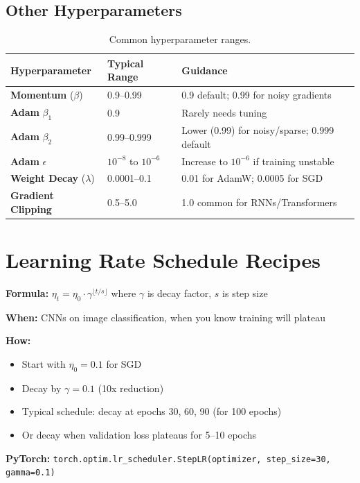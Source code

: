 \documentclass[../main.tex]{subfiles}
\begin{document}
\subsection{Other Hyperparameters}

\begin{table}[htbp]
\centering
\renewcommand{\arraystretch}{1.2}
\begin{tabular}{llp{6cm}}
\toprule
\textbf{Hyperparameter} & \textbf{Typical Range} & \textbf{Guidance} \\
\midrule
\textbf{Momentum} ($\beta$) & 0.9--0.99 & 0.9 default; 0.99 for noisy gradients \\
\textbf{Adam} $\beta_1$ & 0.9 & Rarely needs tuning \\
\textbf{Adam} $\beta_2$ & 0.99--0.999 & Lower (0.99) for noisy/sparse; 0.999 default \\
\textbf{Adam} $\epsilon$ & $10^{-8}$ to $10^{-6}$ & Increase to $10^{-6}$ if training unstable \\
\textbf{Weight Decay} ($\lambda$) & 0.0001--0.1 & 0.01 for AdamW; 0.0005 for SGD \\
\textbf{Gradient Clipping} & 0.5--5.0 & 1.0 common for RNNs/Transformers \\
\bottomrule
\end{tabular}
\caption{Common hyperparameter ranges.}
\label{tab:hyperparam-ranges}
\end{table}

\section{Learning Rate Schedule Recipes}\label{sec:cheat-schedules}

\begin{tcolorbox}[colback=blue!3, colframe=blue!40, title={\textbf{Step Decay}}, fonttitle=\bfseries]
\textbf{Formula:} $\eta_t = \eta_0 \cdot \gamma^{\lfloor t / s \rfloor}$ where $\gamma$ is decay factor, $s$ is step size

\textbf{When:} CNNs on image classification, when you know training will plateau

\textbf{How:}
\begin{itemize}[leftmargin=*, itemsep=1pt]
    \item Start with $\eta_0 = 0.1$ for SGD
    \item Decay by $\gamma = 0.1$ (10x reduction)
    \item Typical schedule: decay at epochs 30, 60, 90 (for 100 epochs)
    \item Or decay when validation loss plateaus for 5--10 epochs
\end{itemize}

\textbf{PyTorch:} \texttt{torch.optim.lr\_scheduler.StepLR(optimizer, step\_size=30, gamma=0.1)}
\end{tcolorbox}
\end{document}
